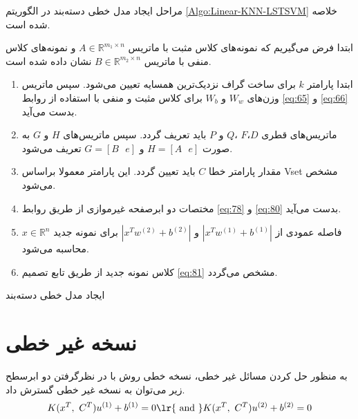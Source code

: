 مراحل ایجاد مدل خطی دسته‌بند  در الگوریتم \ref{Algo:Linear-KNN-LSTSVM} خلاصه شده است.
\\
\begin{algorithm}[h]
\begin{steps}

 	ابتدا فرض می‌گیریم که نمونه‌های کلاس مثبت با ماتریس  $A\in {{\mathbb{R}}^{{{m}_{1}}\times n}}$ و نمونه‌های کلاس منفی با ماتریس  $B\in {{\mathbb{R}}^{{{m}_{2}}\times n}}$ نشان داده شده است.
 	
 	\begin{enumerate}
 		\item ابتدا پارامتر  $k$ برای ساخت گراف نزدیک‌ترین همسایه تعیین می‌شود. سپس ماتریس وزن‌های  $W_{w}$ و   $W_{b}$ برای کلاس مثبت و منفی با استفاده از روابط \ref{eq:65} و \ref{eq:66} بدست می‌آید.
 		\item ماتریس‌های قطری  $D$،$F$ ،$Q$  و $P$ باید تعریف گردد. سپس ماتریس‌های $H$ و  $G$ به صورت  $H=[A\text{ } e]$ و $G=[B\text{ }e]$  تعریف می‌شود.
 		\item مقدار پارامتر خطا $C$ باید تعیین گردد. این پارامتر معمولا براساس \gls*{Vset} مشخص می‌شود.
 		\item مختصات دو ابرصفحه غیرموازی از طریق روابط \ref{eq:78} و \ref{eq:80} بدست می‌آید.
 		\item فاصله عمودی از $|{{x}^T}{{w}^{(1)}}+{{b}^{(1)}}|$  و  $|{{x}^T}{{w}^{(2)}}+{{b}^{(2)}}|$ برای نمونه جدید   $x \in \mathbb{R}^{n}$ محاسبه می‌شود.
 		\item کلاس نمونه جدید از طریق تابع تصمیم \ref{eq:81} مشخص می‌گردد.
 	\end{enumerate}
\end{steps}
\caption{ ایجاد مدل خطی دسته‌بند }
\label{Algo:Linear-KNN-LSTSVM}
\end{algorithm}
 
\section{نسخه غیر خطی}\label{sec:3:3}
به منظور حل کردن مسائل غیر خطی، نسخه خطی روش  با در نظرگرفتن دو ابرسطح  زیر می‌توان به نسخه غیر خطی گسترش داد.
\begin{equation}\label{eq:82}
K({{x}^{T}},~{{C}^{T}}){{u}^{\left( 1 \right)}}+{{b}^{\left( 1 \right)}}=0 \text{\lr{ and }} K({{x}^{T}},~{{C}^{T}}){{u}^{\left( 2 \right)}}+{{b}^{\left( 2 \right)}}=0
\end{equation}

